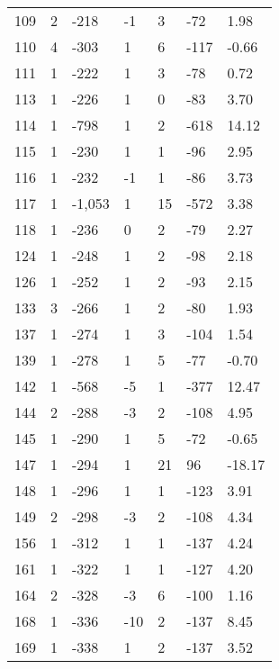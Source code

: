 \begin{appendices}
\begin{longtable}[c]{@{}lllllll@{}}
\rowcolor[HTML]{FFCCC9}
109 & 2 & -218 & -1 & 3 & -72 & 1.98 \\
\rowcolor[HTML]{FFCCC9}
110 & 4 & -303 & 1 & 6 & -117 & -0.66 \\
\rowcolor[HTML]{FFCCC9}
111 & 1 & -222 & 1 & 3 & -78 & 0.72 \\
\rowcolor[HTML]{FFCCC9}
113 & 1 & -226 & 1 & 0 & -83 & 3.70 \\
\rowcolor[HTML]{FFCCC9}
114 & 1 & -798 & 1 & 2 & -618 & 14.12 \\
\rowcolor[HTML]{FFCCC9}
115 & 1 & -230 & 1 & 1 & -96 & 2.95 \\
\rowcolor[HTML]{FFCCC9}
116 & 1 & -232 & -1 & 1 & -86 & 3.73 \\
\rowcolor[HTML]{FFCCC9}
117 & 1 & -1,053 & 1 & 15 & -572 & 3.38 \\
\rowcolor[HTML]{FFCCC9}
118 & 1 & -236 & 0 & 2 & -79 & 2.27 \\
\rowcolor[HTML]{FFCCC9}
124 & 1 & -248 & 1 & 2 & -98 & 2.18 \\
\rowcolor[HTML]{FFCCC9}
126 & 1 & -252 & 1 & 2 & -93 & 2.15 \\
\rowcolor[HTML]{FFCCC9}
133 & 3 & -266 & 1 & 2 & -80 & 1.93 \\
\rowcolor[HTML]{FFCCC9}
137 & 1 & -274 & 1 & 3 & -104 & 1.54 \\
\rowcolor[HTML]{FFCCC9}
139 & 1 & -278 & 1 & 5 & -77 & -0.70 \\
\rowcolor[HTML]{FFCCC9}
142 & 1 & -568 & -5 & 1 & -377 & 12.47 \\
\rowcolor[HTML]{FFCCC9}
144 & 2 & -288 & -3 & 2 & -108 & 4.95 \\
\rowcolor[HTML]{FFCCC9}
145 & 1 & -290 & 1 & 5 & -72 & -0.65 \\
\rowcolor[HTML]{FFCCC9}
147 & 1 & -294 & 1 & 21 & 96 & -18.17 \\
\rowcolor[HTML]{FFCCC9}
148 & 1 & -296 & 1 & 1 & -123 & 3.91 \\
\rowcolor[HTML]{FFCCC9}
149 & 2 & -298 & -3 & 2 & -108 & 4.34 \\
\rowcolor[HTML]{FFCCC9}
156 & 1 & -312 & 1 & 1 & -137 & 4.24 \\
\rowcolor[HTML]{FFCCC9}
161 & 1 & -322 & 1 & 1 & -127 & 4.20 \\
\rowcolor[HTML]{FFCCC9}
164 & 2 & -328 & -3 & 6 & -100 & 1.16 \\
\rowcolor[HTML]{FFCCC9}
168 & 1 & -336 & -10 & 2 & -137 & 8.45 \\
\rowcolor[HTML]{FFCCC9}
169 & 1 & -338 & 1 & 2 & -137 & 3.52 \\

\end{longtable}
\end{appendices}
